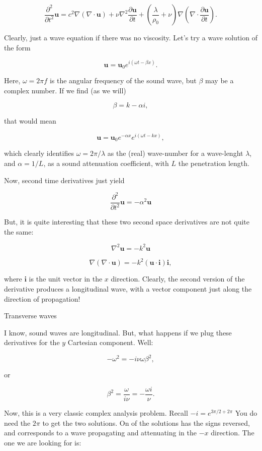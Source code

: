 \[ \frac{\partial^2 }{\partial t^2 } \mathbf{u} =c^2\nabla
(\nabla\cdot\mathbf{u}) + \nu
\nabla^2\frac{\partial\mathbf{u}}{\partial t} +
\left(\frac{\lambda}{\rho_0}+\nu\right) \nabla (\nabla\cdot
\frac{\partial\mathbf{u}}{\partial t} ) .\]

Clearly, just a wave equation if there was no viscosity. Let's try a
wave solution of the form

\[ \mathbf{u} = \mathbf{u}_0 e^{i(\omega t - \beta x)} .\]

Here, $ \omega=2\pi f$ is the angular frequency of the sound wave, but
$ \beta$ may be a complex number. If we find (as we will)

\[ \beta = k - \alpha i ,\]

that would mean

\[ \mathbf{u} = \mathbf{u}_0e^{- \alpha x} e^{i(\omega t - k x)} ,\]

which clearly identifies $ \omega=2\pi /\lambda$ as the (real)
wave-number for a wave-lenght $ \lambda$, and $ \alpha=1 /L $, as a
sound attenuation coefficient, with $ L $ the penetration length.

Now, second time derivatives just yield

\[ \frac{\partial^2 }{\partial t^2 } \mathbf{u} = -\alpha^2 \mathbf{u}\]

But, it is quite interesting that these two second space derivatives
are not quite the same:

\[ \nabla^2 \mathbf{u} = -k^2 \mathbf{u}\]

\[ \nabla (\nabla\cdot \mathbf{u} ) = -k^2
(\mathbf{u}\cdot\mathbf{i})\mathbf{i} ,\]

where $ \mathbf{i} $ is the unit vector in the $x$ direction. Clearly,
the second version of the derivative produces a longitudinal wave,
with a vector component just along the direction of propagation!


Transverse waves


I know, sound waves are longitudinal. But, what happens if we plug
these derivatives for the $y$ Cartesian component. Well:

\[ -\omega^2 = - i \nu \omega \beta^2,\]

or

\[ \beta^2 = \frac{\omega}{i \nu} = - \frac{\omega i}{\nu} .\]

Now, this is a very classic complex analysis problem. Recall $
-i=e^{3\pi/2+2\pi} $ You do need the $ 2\pi$ to get the two
solutions. On of the solutions has the signs reversed, and corresponds
to a wave propagating and attenuating in the $-x$ direction. The one
we are looking for is:

